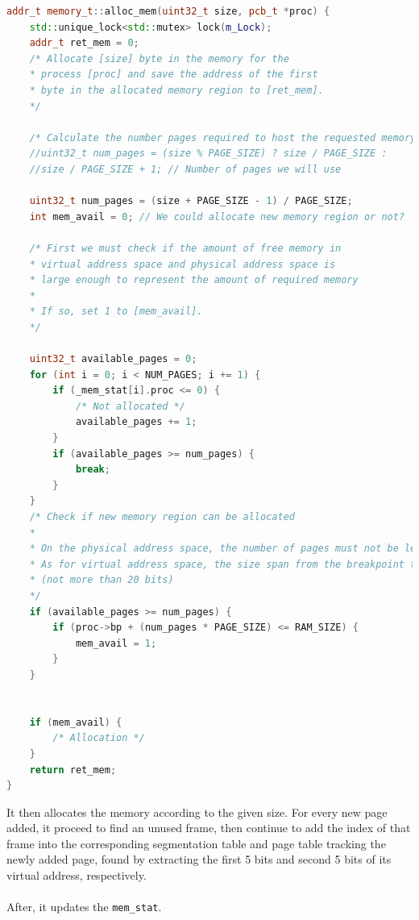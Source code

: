 \documentclass[]{article}
\begin{document}
\begin{lstlisting}[language=C++]
addr_t memory_t::alloc_mem(uint32_t size, pcb_t *proc) {
	std::unique_lock<std::mutex> lock(m_Lock);
	addr_t ret_mem = 0;
	/* Allocate [size] byte in the memory for the
	* process [proc] and save the address of the first
	* byte in the allocated memory region to [ret_mem].
	*/
	
	/* Calculate the number pages required to host the requested memory */
	//uint32_t num_pages = (size % PAGE_SIZE) ? size / PAGE_SIZE :
	//size / PAGE_SIZE + 1; // Number of pages we will use
	
	uint32_t num_pages = (size + PAGE_SIZE - 1) / PAGE_SIZE;
	int mem_avail = 0; // We could allocate new memory region or not?
	
	/* First we must check if the amount of free memory in
	* virtual address space and physical address space is
	* large enough to represent the amount of required memory
	*
	* If so, set 1 to [mem_avail].
	*/
	
	uint32_t available_pages = 0;
	for (int i = 0; i < NUM_PAGES; i += 1) {
		if (_mem_stat[i].proc <= 0) {
			/* Not allocated */
			available_pages += 1;
		}
		if (available_pages >= num_pages) {
			break;
		}
	}
	/* Check if new memory region can be allocated
	*
	* On the physical address space, the number of pages must not be less than number of available pages
	* As for virtual address space, the size span from the breakpoint to its final segment must be less than the maximum address possible
	* (not more than 20 bits)
	*/
	if (available_pages >= num_pages) {
		if (proc->bp + (num_pages * PAGE_SIZE) <= RAM_SIZE) {
			mem_avail = 1;
		}
	}
	
	
	if (mem_avail) {
		/* Allocation */
	}
	return ret_mem;
}
\end{lstlisting}
It then allocates the memory according to the given size. For every new page added, it proceed to find an unused frame, then continue to add the index of that frame into the corresponding segmentation table and page table tracking the newly added page, found by extracting the first 5 bits and second 5 bits of its virtual address, respectively.\\
\\
After, it updates the \lstinline|mem_stat|.
\end{document}
